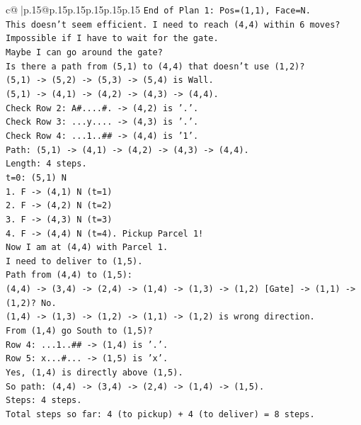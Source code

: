 \documentclass{article}
\begin{document}
{\begin{supertabular}{c@{$\;$}|p{.15\linewidth}@{}p{.15\linewidth}p{.15\linewidth}p{.15\linewidth}p{.15\linewidth}p{.15\linewidth}}
{{{\texttt{End of Plan 1: Pos=(1,1), Face=N.} \\
\texttt{This doesn't seem efficient. I need to reach (4,4) within 6 moves? Impossible if I have to wait for the gate.} \\
\texttt{Maybe I can go around the gate?} \\
\texttt{Is there a path from (5,1) to (4,4) that doesn't use (1,2)?} \\
\texttt{(5,1) {-}> (5,2) {-}> (5,3) {-}> (5,4) is Wall.} \\
\texttt{(5,1) {-}> (4,1) {-}> (4,2) {-}> (4,3) {-}> (4,4).} \\
\texttt{Check Row 2: A\#....\#. {-}> (4,2) is '.'.} \\
\texttt{Check Row 3: ...y.... {-}> (4,3) is '.'.} \\
\texttt{Check Row 4: ...1..\#\# {-}> (4,4) is '1'.} \\
\texttt{Path: (5,1) {-}> (4,1) {-}> (4,2) {-}> (4,3) {-}> (4,4).} \\
\texttt{Length: 4 steps.} \\
\texttt{t=0: (5,1) N} \\
\texttt{1. F {-}> (4,1) N (t=1)} \\
\texttt{2. F {-}> (4,2) N (t=2)} \\
\texttt{3. F {-}> (4,3) N (t=3)} \\
\texttt{4. F {-}> (4,4) N (t=4). Pickup Parcel 1!} \\
\texttt{Now I am at (4,4) with Parcel 1.} \\
\texttt{I need to deliver to (1,5).} \\
\texttt{Path from (4,4) to (1,5):} \\
\texttt{(4,4) {-}> (3,4) {-}> (2,4) {-}> (1,4) {-}> (1,3) {-}> (1,2) {[}Gate{]} {-}> (1,1) {-}> (1,2)? No.} \\
\texttt{(1,4) {-}> (1,3) {-}> (1,2) {-}> (1,1) {-}> (1,2) is wrong direction.} \\
\texttt{From (1,4) go South to (1,5)?} \\
\texttt{Row 4: ...1..\#\# {-}> (1,4) is '.'.} \\
\texttt{Row 5: x...\#... {-}> (1,5) is 'x'.} \\
\texttt{Yes, (1,4) is directly above (1,5).} \\
\texttt{So path: (4,4) {-}> (3,4) {-}> (2,4) {-}> (1,4) {-}> (1,5).} \\
\texttt{Steps: 4 steps.} \\
\texttt{Total steps so far: 4 (to pickup) + 4 (to deliver) = 8 steps.} \\
}}}
\end{supertabular}}
\end{document}
